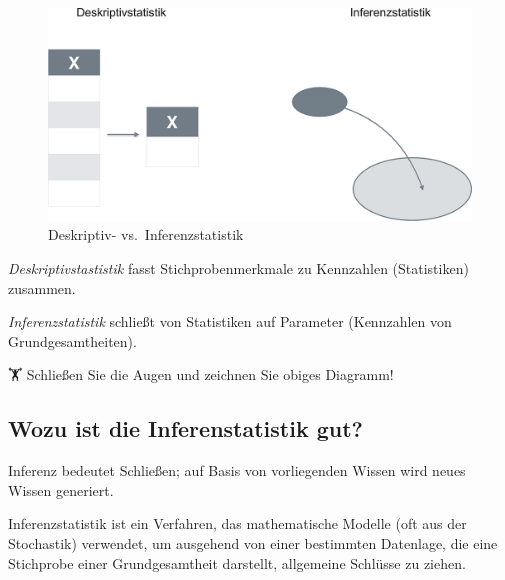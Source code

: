 \documentclass[
  a4paper,
  DIV=11]{scrreprt}
\theoremstyle{definition}
\theoremstyle{remark}
\begin{document}
\begin{figure}

{\centering \includegraphics{./img/desk_vs_inf-crop.png}

}

\caption{\label{fig-inf1}Deskriptiv- vs.~Inferenzstatistik}

\end{figure}

\emph{Deskriptivstastistik} fasst Stichprobenmerkmale zu Kennzahlen
(Statistiken) zusammen.

\emph{Inferenzstatistik} schließt von Statistiken auf Parameter
(Kennzahlen von Grundgesamtheiten).

🏋 Schließen Sie die Augen und zeichnen Sie obiges Diagramm!

\hypertarget{wozu-ist-die-inferenstatistik-gut}{%
\subsection{Wozu ist die Inferenstatistik
gut?}\label{wozu-ist-die-inferenstatistik-gut}}

\begin{tcolorbox}[enhanced jigsaw, leftrule=.75mm, toptitle=1mm, bottomtitle=1mm, titlerule=0mm, breakable, colframe=quarto-callout-note-color-frame, title=\textcolor{quarto-callout-note-color}{\faInfo}\hspace{0.5em}{Hinweis}, rightrule=.15mm, colback=white, arc=.35mm, left=2mm, bottomrule=.15mm, coltitle=black, opacitybacktitle=0.6, toprule=.15mm, colbacktitle=quarto-callout-note-color!10!white, opacityback=0]
Inferenz bedeutet Schließen; auf Basis von vorliegenden Wissen wird
neues Wissen generiert.
\end{tcolorbox}

Inferenzstatistik ist ein Verfahren, das mathematische Modelle (oft aus
der Stochastik) verwendet, um ausgehend von einer bestimmten Datenlage,
die eine Stichprobe einer Grundgesamtheit darstellt, allgemeine Schlüsse
zu ziehen.
\end{document}
